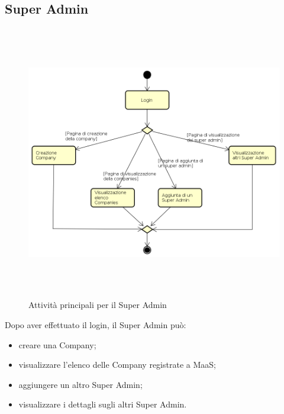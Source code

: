 \subsection{Super Admin}
\begin{figure}[H]
\begin{center}
\includegraphics[height=12cm]{res/sections/backend/activities/principaliSuperAdmin.png}
\caption{Attività principali per il Super Admin}
\end{center}
\end{figure}
Dopo aver effettuato il login, il Super Admin può:
\begin{itemize}
\item creare una Company;
\item visualizzare l'elenco delle Company registrate a MaaS;
\item aggiungere un altro Super Admin;
\item visualizzare i dettagli sugli altri Super Admin.
\end{itemize}
